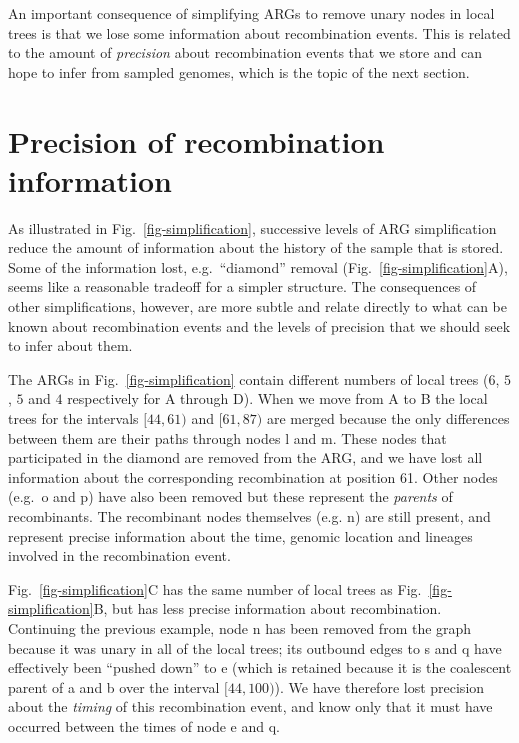 \documentclass{article}
\newcommand{\noderef}[1]{\textsf{#1}}
\begin{document}
An important consequence of simplifying ARGs to remove
unary nodes in local trees is that we lose some information
about recombination
events. This is related to the amount of \emph{precision} about
recombination events that we store and
can hope to infer from sampled genomes, which is the topic of the next
section.

\section{Precision of recombination information}
\label{sec-precision}
As illustrated in Fig.~\ref{fig-simplification}, successive levels
of ARG simplification reduce the amount of information about the
history of the sample that is stored. Some of the information lost,
e.g.\ ``diamond'' removal (Fig.~\ref{fig-simplification}A),
seems like a reasonable tradeoff for a simpler structure.
The consequences of other simplifications, however, are
more subtle and relate directly to what can be known about
recombination events and the levels of precision that
we should seek to infer about them.

The ARGs in Fig.~\ref{fig-simplification} contain different
numbers of local trees ($6$, $5$, $5$ and $4$ respectively for A through
D). When we move from A to B the local trees
for the intervals $[44,61)$ and $[61,87)$ are merged because
the only differences between them are their paths through
nodes \noderef{l} and \noderef{m}. These nodes that participated
in the diamond are removed from the ARG, and we have lost
all information about the corresponding recombination at
position 61. Other nodes (e.g.\ \noderef{o} and \noderef{p})
have also been removed but these represent the \emph{parents}
of recombinants. The recombinant nodes themselves
(e.g. \noderef{n}) are still present, and represent precise
information about the time, genomic location and
lineages involved in the recombination event.

Fig.~\ref{fig-simplification}C has the same number of local trees
as Fig.~\ref{fig-simplification}B, but has less precise information
about recombination. Continuing the previous example, node
\noderef{n} has been removed from the graph because it was unary
in all of the local trees; its outbound edges to \noderef{s}
and \noderef{q} have effectively been ``pushed down''
to \noderef{e} (which is retained because it is the coalescent
parent of \noderef{a} and \noderef{b} over the interval
$[44, 100)$). We
have therefore lost precision about
the \emph{timing} of this recombination event, and know only
that it must have occurred between the times of node \noderef{e}
and \noderef{q}.
\end{document}
